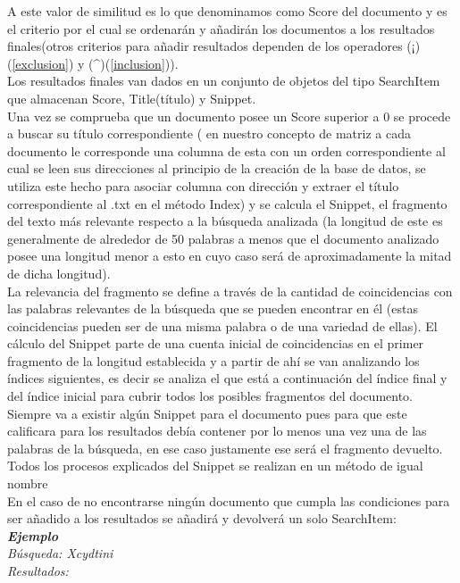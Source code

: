 \documentclass[options]{article}
\begin{document}
A este valor de similitud es lo que denominamos como Score del documento y es el criterio por el cual se ordenarán y añadirán los documentos a los resultados finales(otros criterios para añadir resultados dependen de los operadores (¡)(\ref{exclusion}) y (\textasciicircum)(\ref{inclusion})).\\
Los resultados finales van dados en un conjunto de objetos del tipo SearchItem que almacenan Score, Title(título) y Snippet.\\
Una vez se comprueba que un documento posee un Score superior a 0 se procede a buscar su título correspondiente ( en nuestro concepto de matriz a cada documento le corresponde una columna de esta con un orden correspondiente al cual se leen sus direcciones al principio de la creación de la base de datos, se utiliza este hecho para asociar columna con dirección y extraer el título correspondiente al .txt en el método Index) y se calcula el Snippet, el fragmento del texto más relevante respecto a la búsqueda analizada (la longitud de este es generalmente de alrededor de 50 palabras a menos que el documento analizado posee una longitud menor a esto en cuyo caso será de aproximadamente la mitad de dicha longitud).\\
La relevancia del fragmento se define a través de la cantidad de coincidencias con las palabras relevantes de la búsqueda que se pueden encontrar en él (estas coincidencias pueden ser de una misma palabra o de una variedad de ellas). El cálculo del Snippet parte de una cuenta inicial de coincidencias en el primer fragmento de la longitud establecida y a partir de ahí se van analizando los índices siguientes, es decir se analiza el que está a continuación del índice final y del índice inicial para cubrir todos los posibles fragmentos del documento.\\
Siempre va a existir algún Snippet para el documento pues para que este calificara para los resultados debía contener por lo menos una vez una de las palabras de la búsqueda, en ese caso justamente ese será el fragmento devuelto.\\
Todos los procesos explicados del Snippet se realizan en un método de igual nombre\\
En el caso de no encontrarse ningún documento que cumpla las condiciones para ser añadido a los resultados se añadirá y devolverá un solo SearchItem:\\
\textbf{\textit{Ejemplo}}\\
\textit{Búsqueda: Xcydtini}\\
\textit{Resultados:}
\end{document}
